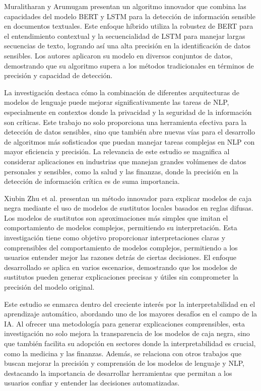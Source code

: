 Muralitharan y Arumugam \cite{Muralitharan2024} presentan un algoritmo innovador que combina las capacidades del modelo BERT y LSTM para la detección de información sensible en documentos textuales. Este enfoque híbrido utiliza la robustez de BERT para el entendimiento contextual y la secuencialidad de LSTM para manejar largas secuencias de texto, logrando así una alta precisión en la identificación de datos sensibles. Los autores aplicaron su modelo en diversos conjuntos de datos, demostrando que su algoritmo supera a los métodos tradicionales en términos de precisión y capacidad de detección.

La investigación destaca cómo la combinación de diferentes arquitecturas de modelos de lenguaje puede mejorar significativamente las tareas de NLP, especialmente en contextos donde la privacidad y la seguridad de la información son críticas. Este trabajo no solo proporciona una herramienta efectiva para la detección de datos sensibles, sino que también abre nuevas vías para el desarrollo de algoritmos más sofisticados que puedan manejar tareas complejas en NLP con mayor eficiencia y precisión. La relevancia de este estudio se magnifica al considerar aplicaciones en industrias que manejan grandes volúmenes de datos personales y sensibles, como la salud y las finanzas, donde la precisión en la detección de información crítica es de suma importancia.

Xiubin Zhu et al. \cite{Zhu2023} presentan un método innovador para explicar modelos de caja negra mediante el uso de modelos de sustitutos locales basados en reglas difusas. Los modelos de sustitutos son aproximaciones más simples que imitan el comportamiento de modelos complejos, permitiendo su interpretación. Esta investigación tiene como objetivo proporcionar interpretaciones claras y comprensibles del comportamiento de modelos complejos, permitiendo a los usuarios entender mejor las razones detrás de ciertas decisiones. El enfoque desarrollado se aplica en varios escenarios, demostrando que los modelos de sustitutos pueden generar explicaciones precisas y útiles sin comprometer la precisión del modelo original.

Este estudio se enmarca dentro del creciente interés por la interpretabilidad en el aprendizaje automático, abordando uno de los mayores desafíos en el campo de la IA. Al ofrecer una metodología para generar explicaciones comprensibles, esta investigación no solo mejora la transparencia de los modelos de caja negra, sino que también facilita su adopción en sectores donde la interpretabilidad es crucial, como la medicina y las finanzas. Además, se relaciona con otros trabajos que buscan mejorar la precisión y comprensión de los modelos de lenguaje y NLP, destacando la importancia de desarrollar herramientas que permitan a los usuarios confiar y entender las decisiones automatizadas.

